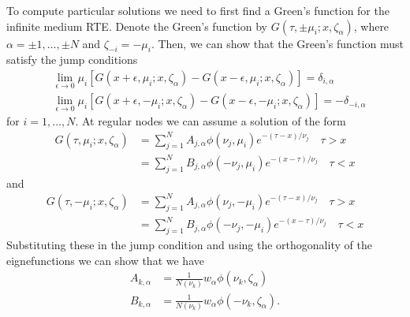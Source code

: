 \documentclass[11pt]{article}
\begin{document}
To compute particular solutions we need to first find a Green's
function for the infinite medium RTE. Denote the Green's function by
$G(\tau,\pm\mu_i; x,\zeta_\alpha)$, where $\alpha = \pm 1, \ldots, \pm
N$ and $\zeta_{-i} = -\mu_i$. Then, we can show that the Green's
function must satisfy the jump conditions
\begin{align}
  &\lim_{\epsilon \rightarrow 0} \mu_i
  \left[
    G(x+\epsilon, \mu_i; x, \zeta_\alpha)
    -
    G(x-\epsilon, \mu_i; x, \zeta_\alpha)
  \right] = \delta_{i,\alpha} \\
  &\lim_{\epsilon \rightarrow 0} \mu_i
  \left[
    G(x+\epsilon, -\mu_i; x, \zeta_\alpha)
    -
    G(x-\epsilon, -\mu_i; x, \zeta_\alpha)
  \right] = -\delta_{-i,\alpha}
\end{align}
for $i=1,\ldots,N$. At regular nodes we can assume a solution of the
form
\begin{align}
  G(\tau,\mu_i;x,\zeta_\alpha) 
  &= \sum_{j=1}^N A_{j,\alpha} \phi(\nu_j,\mu_i) e^{-(\tau-x)/\nu_j} 
  \quad \tau>x
  \\
  &= \sum_{j=1}^N B_{j,\alpha} \phi(-\nu_j,\mu_i) e^{-(x-\tau)/\nu_j}
  \quad \tau<x
\end{align}
and
\begin{align}
  G(\tau,-\mu_i;x,\zeta_\alpha) 
  &= \sum_{j=1}^N A_{j,\alpha} \phi(\nu_j,-\mu_i) e^{-(\tau-x)/\nu_j} 
  \quad \tau>x
  \\
  &= \sum_{j=1}^N B_{j,\alpha} \phi(-\nu_j,-\mu_i) e^{-(x-\tau)/\nu_j}
  \quad \tau<x
\end{align}
Substituting these in the jump condition and using the orthogonality
of the eignefunctions we can show that we have
\begin{align}
  A_{k,\alpha} &= \frac{1}{N(\nu_k)} w_\alpha \phi(\nu_k,\zeta_\alpha) \\
  B_{k,\alpha} &= \frac{1}{N(\nu_k)} w_\alpha \phi(-\nu_k,\zeta_\alpha).
\end{align}
\end{document}
